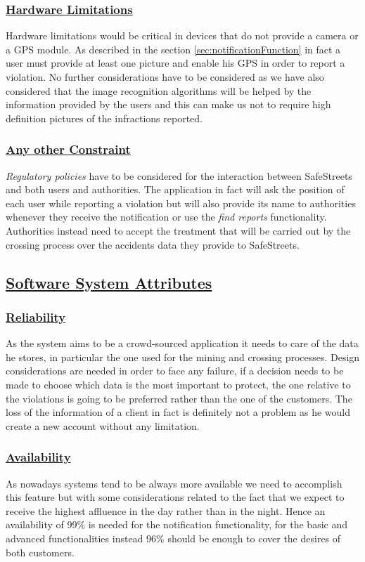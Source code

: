		\subsubsection[Hardware Limitations]{\hyperlink{toc}{Hardware Limitations}}
			Hardware limitations would be critical in devices that do not provide a camera or a GPS module. As described in the section \ref{sec:notificationFunction} in fact a user must provide at least one picture and enable his GPS in order to report a violation. No further considerations have to be considered as we have also considered that the image recognition algorithms will be helped by the information provided by the users and this can make us not to require high definition pictures of the infractions reported.
		\subsubsection[Any other Constraint]{\hyperlink{toc}{Any other Constraint}}
			\emph{Regulatory policies}  have to be considered for the interaction between SafeStreets and both users and authorities. The application in fact will ask the position of each user while reporting a violation but will also provide its name to authorities whenever they receive the notification or use the \emph{find reports} functionality.
			Authorities instead need to accept the treatment that will be carried out by the crossing process over the accidents data they provide to SafeStreets.
	
	\subsection[Software System Attributes]{\hyperlink{toc}{Software System Attributes}}
		\subsubsection[Reliability]{\hyperlink{toc}{Reliability}}
			As the system aims to be a crowd-sourced application it needs to care of the data he stores, in particular the one used for the mining and crossing processes. Design considerations are needed in order to face any failure, if a decision needs to be made to choose which data is the most important to protect, the one relative to the violations is going to be preferred rather than the one of the customers. The loss of the information of a client in fact is definitely not a problem as he would create a new account without any limitation.
		\subsubsection[Availability]{\hyperlink{toc}{Availability}}
			As nowadays systems tend to be always more available we need to accomplish this feature but with some considerations related to the fact that we expect to receive the highest affluence in the day rather than in the night. Hence an availability of 99\% is needed for the notification functionality, for the basic and advanced functionalities instead 96\% should be enough to cover the desires of both customers.
